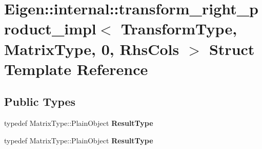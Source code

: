 \hypertarget{struct_eigen_1_1internal_1_1transform__right__product__impl_3_01_transform_type_00_01_matrix_type_00_010_00_01_rhs_cols_01_4}{}\section{Eigen\+:\+:internal\+:\+:transform\+\_\+right\+\_\+product\+\_\+impl$<$ Transform\+Type, Matrix\+Type, 0, Rhs\+Cols $>$ Struct Template Reference}
\label{struct_eigen_1_1internal_1_1transform__right__product__impl_3_01_transform_type_00_01_matrix_type_00_010_00_01_rhs_cols_01_4}
\subsection*{Public Types}
\begin{DoxyCompactItemize}
\item 
\mbox{\label{struct_eigen_1_1internal_1_1transform__right__product__impl_3_01_transform_type_00_01_matrix_type_00_010_00_01_rhs_cols_01_4_ac10dcf24f6329a4468e73a3db5af1798}} 
typedef Matrix\+Type\+::\+Plain\+Object {\bfseries Result\+Type}
\item 
\mbox{\label{struct_eigen_1_1internal_1_1transform__right__product__impl_3_01_transform_type_00_01_matrix_type_00_010_00_01_rhs_cols_01_4_ac10dcf24f6329a4468e73a3db5af1798}} 
typedef Matrix\+Type\+::\+Plain\+Object {\bfseries Result\+Type}
\end{DoxyCompactItemize}
